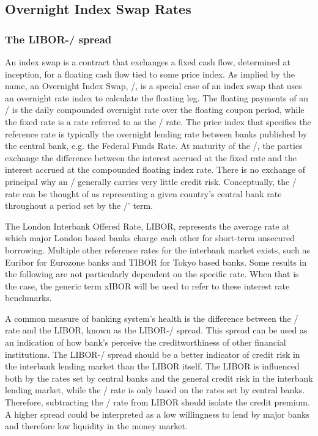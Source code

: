 \documentclass[main.tex]{subfiles}
\begin{document}
    \subsection{Overnight Index Swap Rates}
    
    \subsubsection{The LIBOR-\OIS/ spread}
    An index swap is a contract that exchanges a fixed cash flow, determined at inception,
    for a floating cash flow tied to some price index.
    As implied by the name, an Overnight Index Swap, \OIS/, is a special case of an index swap
    that uses an overnight rate index to calculate the floating leg.
    The floating payments of an \OIS/ is the daily compounded overnight rate 
    over the floating coupon period,
    while the fixed rate is a rate referred to as the \OIS/ rate.
    The price index that specifies the reference rate is typically the overnight 
    lending rate between banks published by the central bank, e.g. the Federal Funds Rate.
    At maturity of the \OIS/, the parties exchange the difference between the interest accrued 
    at the fixed rate and the interest accrued at the compounded floating index rate.
    There is no exchange of principal why an \OIS/ generally carries very little credit risk. 
    Conceptually, the \OIS/ rate can be thought of as representing a given country's
    central bank rate throughout a period set by the \OIS/' term. 

    The London Interbank Offered Rate, LIBOR, represents the average rate 
    at which major London based banks charge each other for short-term unsecured borrowing.
    Multiple other reference rates for the interbank market exists, 
    such as Euribor for Eurozone banks and TIBOR for Tokyo based banks.
    Some results in the following are not particularly dependent on the specific rate.
    When that is the case, the generic term xIBOR will be used 
    to refer to these interest rate benchmarks.

    A common measure of banking system's health is the difference between the \OIS/ rate
    and the LIBOR, known as the LIBOR-\OIS/ spread.
    This spread can be used as an indication of how bank's perceive the creditworthiness
    of other financial institutions. 
    The LIBOR-\OIS/ spread should be a better indicator of credit risk in the interbank lending market
    than the LIBOR itself. 
    The LIBOR is influenced both by the rates set by central banks and 
    the general credit risk in the interbank lending market,
    while the \OIS/ rate is only based on the rates set by central banks.
    Therefore, subtracting the \OIS/ rate from LIBOR should isolate the credit premium.
    A higher spread could be interpreted as a low willingness to lend by major banks
    and therefore low liquidity in the money market.
\end{document}
